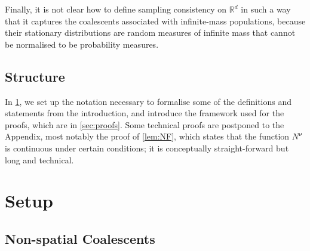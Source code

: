 \documentclass[reqno,draft]{amsart}
\numberwithin{equation}{section}
\theoremstyle{plain}
\theoremstyle{remark}
\newcommand{\R}{\mathbb{R}} %
\begin{document}
Finally, it is not clear how to define sampling consistency on $\R^d$ in such a way that it captures the coalescents associated with infinite-mass populations, because their stationary distributions are random measures of infinite mass that cannot be normalised to be probability measures.

\subsection{Structure}
In \cref{sec:setup}, we set up the notation necessary to formalise some of the definitions and statements from the introduction, and introduce the framework used for the proofs, which are in \cref{sec:proofs}. Some technical proofs are postponed to the Appendix, most notably the proof of \cref{lem:NF}, which states that the function $N^{\boldsymbol \nu}$ is continuous under certain conditions; it is conceptually straight-forward but long and technical. %

\section{Setup}\label{sec:setup}
\subsection{Non-spatial Coalescents}\label{sec:non-spatial}
\end{document}
